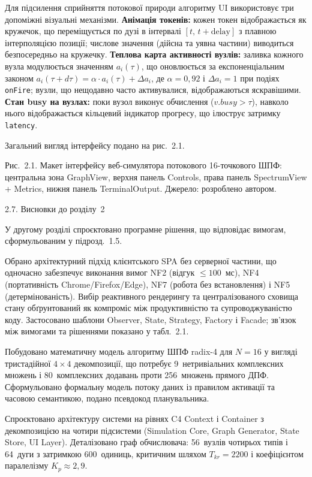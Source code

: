 Для підсилення сприйняття потокової природи алгоритму UI використовує
три допоміжні візуальні механізми. \textbf{Анімація токенів:} кожен
токен відображається як кружечок, що переміщується по дузі в інтервалі
\([t,\,t+\text{delay}]\) з плавною інтерполяцією позиції; числове
значення (дійсна та уявна частини) виводиться безпосередньо на кружечку.
\textbf{Теплова карта активності вузлів:} заливка кожного вузла
модулюється значенням \(a_{i}(\tau)\), що оновлюється за
експоненціальним законом
\(a_{i}(\tau+d\tau)=\alpha\cdot a_{i}(\tau)+\Delta a_{i}\), де
\(\alpha=0{,}92\) і \(\Delta a_{i}=1\) при подіях \texttt{onFire}; вузли,
що нещодавно часто активувалися, відображаються яскравішими.
\textbf{Стан busy на вузлах:} поки вузол виконує обчислення
(\(v.busy>\tau\)), навколо нього відображається кільцевий індикатор
прогресу, що ілюструє затримку \texttt{latency}.

Загальний вигляд інтерфейсу подано на рис.~2.1.

\protect{}\label{fig:ui}{}Рис.~2.1. Макет інтерфейсу
веб-симулятора потокового 16-точкового ШПФ: центральна зона GraphView,
верхня панель Controls, права панель SpectrumView + Metrics, нижня панель
TerminalOutput. Джерело: розроблено автором.

\protect{}\label{_Toc228121478}{}2.7. Висновки до розділу~2

У другому розділі спроєктовано програмне рішення, що відповідає вимогам,
сформульованим у підрозд.~1.5.

Обрано архітектурний підхід клієнтського SPA без серверної частини, що
одночасно забезпечує виконання вимог NF2 (відгук \(\leq100\)~мс), NF4
(портативність Chrome/Firefox/Edge), NF7 (робота без встановлення) і NF5
(детермінованість). Вибір реактивного рендерингу та централізованого
сховища стану обґрунтований як компроміс між продуктивністю та
супроводжуваністю коду. Застосовано шаблони Observer, State, Strategy,
Factory і Facade; зв'язок між вимогами та рішеннями показано у
табл.~2.1.

Побудовано математичну модель алгоритму ШПФ radix-4 для \(N=16\) у
вигляді тристадійної \(4\times4\) декомпозиції, що потребує
9~нетривіальних комплексних множень і 80~комплексних додавань проти
256~множень прямого ДПФ. Сформульовано формальну модель потоку даних із
правилом активації та часовою семантикою, подано псевдокод планувальника.

Спроєктовано архітектуру системи на рівнях C4 Context і Container з
декомпозицією на чотири підсистеми (Simulation Core, Graph Generator,
State Store, UI Layer). Деталізовано граф обчислювача: 56~вузлів
чотирьох типів і 64~дуги з затримкою 600~одиниць, критичним шляхом
\(T_{kr}=2200\) і коефіцієнтом паралелізму \(K_{p}\approx2{,}9\).

